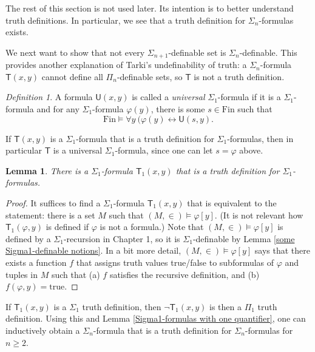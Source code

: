 \documentclass[a4paper, 11pt]{amsart}
\newtheorem{lemma}[lemma]{Lemma}
\theoremstyle{remark}
\newtheorem{definition}[definition]{Definition}
\newcommand{\Fin}{\mathrm{Fin}}
\begin{document}
The rest of this section is not used later. 
Its intention is to better understand truth definitions. 
In particular, we see that a truth definition for $\Sigma_n$-formulas exists.  

We next want to show that not every $\Sigma_{n+1}$-definable set is $\Sigma_n$-definable.
This provides another explanation of Tarki's undefinability of truth: a $\Sigma_n$-formula $\mathsf{T}(x,y)$ cannot define all $\Pi_n$-definable sets, so $\mathsf{T}$ is not a truth definition. 

\begin{definition} 
A formula $\mathsf{U}(x,y)$ is called a \emph{universal} $\Sigma_1$-formula if it is a $\Sigma_1$-formula and for any $\Sigma_1$-formula $\varphi(y)$, there is some $s\in \Fin$ such that 
$$ \Fin \models \forall y\ (\varphi(y)  \leftrightarrow \mathsf{U}(s,y).$$ 
\end{definition} 

If $\mathsf{T}(x,y)$ is a $\Sigma_1$-formula that is a truth definition for $\Sigma_1$-formulas, then in particular $\mathsf{T}$ is a universal $\Sigma_1$-formula, since one can let $s=\varphi$ above. 

\begin{lemma} 
There is a $\Sigma_1$-formula $\mathsf{T}_1(x,y)$ that is a truth definition for $\Sigma_1$-formulas. 
\end{lemma} 
\begin{proof} 
It suffices to find a $\Sigma_1$-formula $\mathsf{T}_1(x,y)$ that is equivalent to the statement: 
there is a set $M$ such that $(M,\in) \models \varphi[y]$. (It is not relevant how $\mathsf{T}_1(\varphi,y)$ is defined if $\varphi$ is not a formula.) 
Note that $(M,\in) \models \varphi[y]$ is defined by a $\Sigma_1$-recursion in Chapter 1, so it is $\Sigma_1$-definable by Lemma \ref{some Sigma1-definable notions}. 
In a bit more detail, $(M,\in) \models \varphi[y]$ says that there exists a function $f$ that assigns truth values true/false to subformulas of $\varphi$ and tuples in $M$ such that (a) $f$ satisfies the recursive definition, and (b) $f(\varphi,y)=\mathrm{true}$. 
\end{proof} 

If $\mathsf{T}_1(x,y)$ is a $\Sigma_1$ truth definition, then $\neg\mathsf{T}_1(x,y)$ is then a $\Pi_1$ truth definition. 
Using this and Lemma \ref{Sigma1-formulas with one quantifier}, one can inductively obtain a $\Sigma_n$-formula that is a truth definition for $\Sigma_n$-formulas for $n\geq 2$. 
\end{document}
